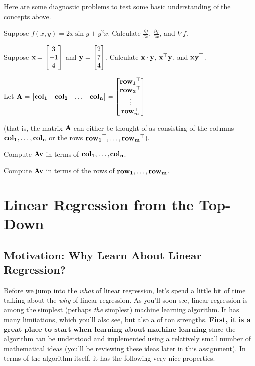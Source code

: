 \documentclass[assignment01_Solutions]{subfiles}
\begin{document}
\begin{exercise}[(20 minutes)]
Here are some diagnostic problems to test some basic understanding of the concepts above.
\bes
\item Suppose $f(x, y) = 2x \sin{y} + y^2 x$.  Calculate $\frac{\partial{f}}{\partial{x}}$, $\frac{\partial{f}}{\partial{x}}$, and $\nabla f$.
\item Suppose $\mathbf{x} = \begin{bmatrix} 3 \\ -1 \\ 4 \end{bmatrix}$ and $\mathbf{y} = \begin{bmatrix} 2 \\  7 \\ 4 \end{bmatrix}$.  Calculate $\mathbf{x} \cdot \mathbf{y}$, $\mathbf{x}^\top \mathbf{y}$, and $\mathbf{x} \mathbf{y}^\top$.
\item Let $\mathbf{A} = \begin{bmatrix} \mathbf{col_1} & \mathbf{col_2} & \ldots & \mathbf{col_n} \end{bmatrix} = \begin{bmatrix} \mathbf{row_1}^\top \\ \mathbf{row_2}^\top \\ \vdots \\ \mathbf{row}_m^\top \end{bmatrix}$

(that is, the matrix $\mathbf{A}$ can either be thought of as consisting of the columns $\mathbf{col_1}, \ldots, \mathbf{col_n}$ or the rows $\mathbf{row_1}^\top, \ldots, \mathbf{row_m}^\top$).

Compute $\mathbf{A}\mathbf{v}$ in terms of $\mathbf{col_1}, \ldots, \mathbf{col_n}$.

Compute $\mathbf{A} \mathbf{v}$ in terms of the rows of $\mathbf{row_1}, \ldots, \mathbf{row_m}$.
\ees
\end{exercise}

\section{Linear Regression from the Top-Down}

\subsection*{Motivation: Why Learn About Linear Regression?}
Before we jump into the \emph{what} of linear regression, let's spend a little bit of time talking about the \emph{why} of linear regression.  As you'll soon see, linear regression is among the simplest (perhaps \emph{the} simplest) machine learning algorithm.  It has many limitations, which you'll also see, but also a of ton strengths.  \textbf{First, it is a great place to start when learning about machine learning} since the algorithm can be understood and implemented using a relatively small number of mathematical ideas (you'll be reviewing these ideas later in this assignment).  In terms of the algorithm itself, it has the following very nice properties.
\end{document}
